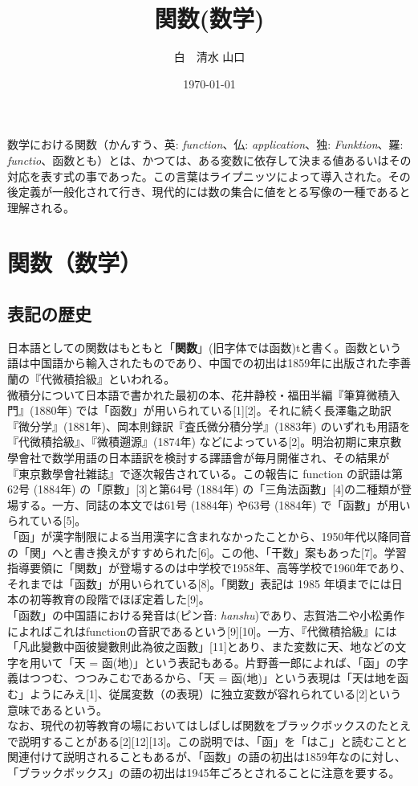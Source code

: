\documentclass[a4j,12pt]{jreport}
\title{関数(数学)}
\author{白　清水 山口}
\date{\today}
\begin{document}
\maketitle
数学における関数（かんすう、英: {\it function}、仏: {\it application}、独: {\it Funktion}、羅: {\it functio}、函数とも）とは、かつては、ある変数に依存して決まる値あるいはその対応を表す式の事であった。この言葉はライプニッツによって導入された。その後定義が一般化されて行き、現代的には数の集合に値をとる写像の一種であると理解される。

\tableofcontents

\chapter{関数（数学）}

\section{表記の歴史}
日本語としての関数はもともと「{\bf 関数}」(旧字体では函数)tと書く。函数という語は中国語から輸入されたものであり、中国での初出は1859年に出版された李善蘭の『代微積拾級』といわれる。\\
微積分について日本語で書かれた最初の本、花井静校・福田半編『筆算微積入門』(1880年) では「函数」が用いられている[1][2]。それに続く長澤龜之助訳『微分学』(1881年)、岡本則録訳『査氏微分積分学』(1883年) のいずれも用語を『代微積拾級』、『微積遡源』(1874年) などによっている[2]。明治初期に東京數學會社で数学用語の日本語訳を検討する譯語會が毎月開催され、その結果が『東京數學會社雑誌』で逐次報告されている。この報告に function の訳語は第62号 (1884年) の「原數」[3]と第64号 (1884年) の「三角法函數」[4]の二種類が登場する。一方、同誌の本文では61号 (1884年) や63号 (1884年) で「函數」が用いられている[5]。\\
「函」が漢字制限による当用漢字に含まれなかったことから、1950年代以降同音の「関」へと書き換えがすすめられた[6]。この他、「干数」案もあった[7]。学習指導要領に「関数」が登場するのは中学校で1958年、高等学校で1960年であり、それまでは「函数」が用いられている[8]。「関数」表記は 1985 年頃までには日本の初等教育の段階でほぼ定着した[9]。\\
「函数」の中国語における発音は(ピン音: {\it hanshu})であり、志賀浩二や小松勇作によればこれはfunctionの音訳であるという[9][10]。一方、『代微積拾級』には「凡此變數中函彼變數則此為彼之函數」[11]とあり、また変数に天、地などの文字を用いて「天 = 函(地)」という表記もある。片野善一郎によれば、「函」の字義はつつむ、つつみこむであるから、「天 = 函(地)」という表現は「天は地を函む」ようにみえ[1]、従属変数（の表現）に独立変数が容れられている[2]という意味であるという。\\
なお、現代の初等教育の場においてはしばしば関数をブラックボックスのたとえで説明することがある[2][12][13]。この説明では、「函」を「はこ」と読むことと関連付けて説明されることもあるが、「函数」の語の初出は1859年なのに対し、「ブラックボックス」の語の初出は1945年ごろとされることに注意を要する。\\
\end{document}
